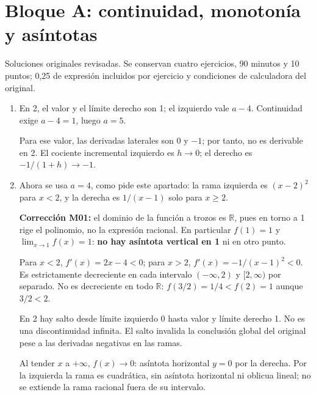 \documentclass[11pt]{article}
\begin{document}
\section*{Bloque A: continuidad, monotonía y asíntotas}
Soluciones originales revisadas. Se conservan cuatro ejercicios, 90 minutos y 10 puntos; 0,25 de expresión incluidos por ejercicio y condiciones de calculadora del original.
\begin{enumerate}[label=(\alph*)]
\item En 2, el valor y el límite derecho son 1; el izquierdo vale $a-4$. Continuidad exige $a-4=1$, luego $\boxed{a=5}$.

Para ese valor, las derivadas laterales son 0 y $-1$; por tanto, no es derivable en 2. El cociente incremental izquierdo es $h\to0$; el derecho es $-1/(1+h)\to-1$.
\item Ahora se usa $a=4$, como pide este apartado: la rama izquierda es $(x-2)^2$ para $x<2$, y la derecha es $1/(x-1)$ solo para $x\geq2$.

\textbf{Corrección M01:} el dominio de la función a trozos es $\mathbb R$, pues en torno a 1 rige el polinomio, no la expresión racional. En particular $f(1)=1$ y $\lim_{x\to1}f(x)=1$: \textbf{no hay asíntota vertical en 1} ni en otro punto.

Para $x<2$, $f'(x)=2x-4<0$; para $x>2$, $f'(x)=-1/(x-1)^2<0$. Es estrictamente decreciente en cada intervalo $(-\infty,2)$ y $[2,\infty)$ por separado. No es decreciente en todo $\mathbb R$: $f(3/2)=1/4<f(2)=1$ aunque $3/2<2$.

En 2 hay salto desde límite izquierdo 0 hasta valor y límite derecho 1. No es una discontinuidad infinita. El salto invalida la conclusión global del original pese a las derivadas negativas en las ramas.

Al tender $x$ a $+\infty$, $f(x)\to0$: asíntota horizontal $\boxed{y=0}$ por la derecha. Por la izquierda la rama es cuadrática, sin asíntota horizontal ni oblicua lineal; no se extiende la rama racional fuera de su intervalo.
\end{enumerate}
\clearpage
\end{document}

